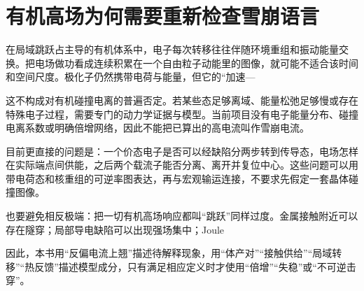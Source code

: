 \documentclass[11pt,a4paper]{article}
\begin{document}
\section{{\cjkfont 有机高场为何需要重新检查雪崩语言}\allowbreak{}}\label{sec:5}
{\cjkfont 在局域跳跃占主导的有机体系中，电子每次转移往往伴随环境重组和振动能量交换。把电场做功看成连续积累在一个自由粒子动能里的图像，就可能不适合该时间和空间尺度。极化子仍然携带电荷与能量，但它的“加速}\allowbreak{}—\allowbreak{}
\par
{\cjkfont 这不构成对有机碰撞电离的普遍否定。若某些态足够离域、能量松弛足够慢或存在特殊电子过程，需要专门的动力学证据与模型。当前项目没有电子能量分布、碰撞电离系数或明确倍增网络，因此不能把已算出的高电流叫作雪崩电流。}\allowbreak{}
\par
{\cjkfont 目前更直接的问题是：一个价态电子是否可以经缺陷分两步转到传导态，电场怎样在实际端点间供能，之后两个载流子能否分离、离开并复位中心。这些问题可以用带电荷态和核重组的可逆率图表达，再与宏观输运连接，不要求先假定一套晶体碰撞图像。}\allowbreak{}
\par
{\cjkfont 也要避免相反极端：把一切有机高场响应都叫“跳跃”同样过度。金属接触附近可以存在隧穿；局部导电缺陷可以出现强场集中；}\allowbreak{}Joule\allowbreak{}
\par
{\cjkfont 因此，本书用“反偏电流上翘”描述待解释现象，用“体产对”“接触供给”“局域转移”“热反馈”描述模型成分，只有满足相应定义时才使用“倍增”“失稳”或“不可逆击穿”。}\allowbreak{}
\par
{}
\medskip
\FloatBarrier
\Needspace{110pt}
\end{document}
